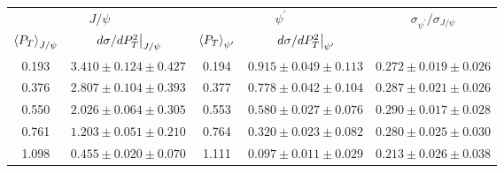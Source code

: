 \begin{tabular}{cc|cc|c}
\hline
\multicolumn{2}{c|}{$J/\psi$} &
  \multicolumn{2}{c|}{$\psi^{\prime}$} &
  \multirow{2}{*}{$\sigma_{\psi^\prime}/\sigma_{J/\psi}$} \\ \cline{1-4}
$\expval{P_T}_{J/\psi}$ &
  $\eval{d\sigma/dP^2_T}_{J/\psi}$ &
  $\expval{P_T}_{\psi^\prime}$ &
  $\eval{d\sigma/dP^2_T}_{\psi^\prime}$ &
   \\ \hline
0.193 & $3.410\pm0.124\pm0.427$ & 0.194 & $0.915\pm0.049\pm0.113$ & $0.272\pm0.019\pm0.026$ \\
0.376 & $2.807\pm0.104\pm0.393$ & 0.377 & $0.778\pm0.042\pm0.104$ & $0.287\pm0.021\pm0.026$ \\
0.550 & $2.026\pm0.064\pm0.305$ & 0.553 & $0.580\pm0.027\pm0.076$ & $0.290\pm0.017\pm0.028$ \\
0.761 & $1.203\pm0.051\pm0.210$ & 0.764 & $0.320\pm0.023\pm0.082$ & $0.280\pm0.025\pm0.030$ \\
1.098 & $0.455\pm0.020\pm0.070$ & 1.111 & $0.097\pm0.011\pm0.029$ & $0.213\pm0.026\pm0.038$ \\ \hline
\end{tabular}
